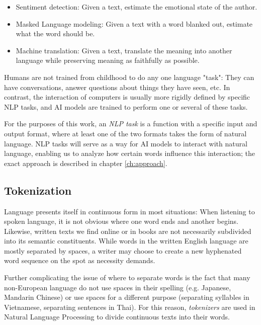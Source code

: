 \begin{itemize}
	\item Sentiment detection: Given a text, estimate the emotional state of the author.
	\item Masked Language modeling: Given a text with a word blanked out, estimate what the word should be.
	\item Machine translation: Given a text, translate the meaning into another language while preserving meaning as faithfully as possible.
\end{itemize}


Humans are not trained from childhood to do any one language "task":
They can have conversations, answer questions about things they have seen, etc.
In contrast, the interaction of computers is usually more rigidly defined by specific NLP tasks, and AI models are trained to perform one or several of these tasks.

For the purposes of this work, an \textit{NLP task} is a function with a specific input and output format, where at least one of the two formats takes the form of natural language.
NLP tasks will serve as a way for AI models to interact with natural language, enabling us to analyze how certain words influence this interaction; the exact approach is described in chapter \ref{ch:approach}.


\subsection{Tokenization}
Language presents itself in continuous form in most situations:
When listening to spoken language, it is not obvious where one word ends and another begins.
Likewise, written texts we find online or in books are not necessarily subdivided into its semantic constituents.
While words in the written English language are mostly separated by spaces, a writer may choose to create a new hyphenated word sequence on the spot as necessity demands.

Further complicating the issue of where to separate words is the fact that many non-European language do not use spaces in their spelling (e.g. Japanese, Mandarin Chinese) or use spaces for a different purpose (separating syllables in Vietnamese, separating sentences in Thai).
For this reason, \textit{tokenizers} are used in Natural Language Processing to divide continuous texts into their words. 

